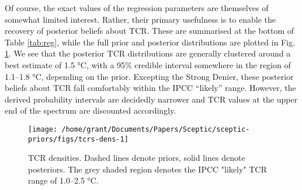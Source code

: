 \documentclass[smallextended]{svjour3}       %
\begin{document}
\begin{table}
\begin{threeparttable}
\begin{tablenotes}[para]
\end{tablenotes}
\end{threeparttable}
\end{table}

Of course, the exact values of the regression parameters are themselves
of somewhat limited interest. Rather, their primary usefulness is to
enable the recovery of posterior beliefs about TCR. These are summarised
at the bottom of Table \ref{tab:reg}, while the full prior and posterior
distributions are plotted in Fig. \ref{fig:tcrs-dens}. We see that the
posterior TCR distributions are generally clustered around a best
estimate of 1.5 °C, with a 95\% credible interval somewhere in the
region of 1.1--1.8 °C, depending on the prior. Excepting the Strong
Denier, these posterior beliefs about TCR fall comfortably within the
IPCC ``likely'' range. However, the derived probability intervals are
decidedly narrower and TCR values at the upper end of the spectrum are
discounted accordingly.

\begin{figure}

{\centering \texttt{[image: /home/grant/Documents/Papers/Sceptic/sceptic-priors/figs/tcrs-dens-1]} 

}

\caption{TCR densities. Dashed lines denote priors, solid lines denote posteriors. The grey shaded region denotes the IPCC "likely" TCR range of 1.0--2.5 °C.}\label{fig:tcrs-dens}
\end{figure}
\end{document}
